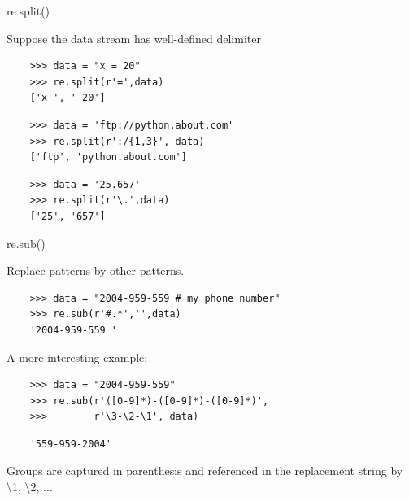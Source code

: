 \documentclass[xcolor=table,10pt,handout]{beamer}
\begin{document}
\begin{frame}[fragile]{re.split()}

  Suppose the data stream has well-defined delimiter

  \vspace{0.4cm}
  \begin{verbatim}
    >>> data = "x = 20"
    >>> re.split(r'=',data)
    ['x ', ' 20']
  \end{verbatim}
  \vspace{0.2cm}
  \pause
  \begin{verbatim} 
    >>> data = 'ftp://python.about.com'
    >>> re.split(r':/{1,3}', data)
    ['ftp', 'python.about.com']
  \end{verbatim}
  \vspace{0.2cm}
  \pause
  \begin{verbatim}
    >>> data = '25.657'
    >>> re.split(r'\.',data)
    ['25', '657']
  \end{verbatim}


\end{frame}



\begin{frame}[fragile]{re.sub()}

  Replace patterns by other patterns.

  \medskip

  \begin{verbatim}
    >>> data = "2004-959-559 # my phone number"
    >>> re.sub(r'#.*','',data)
    '2004-959-559 '
  \end{verbatim}
  \vspace{0.3cm}

  \pause
  A more interesting example:
  
  \medskip

  \begin{verbatim}
    >>> data = "2004-959-559"
    >>> re.sub(r'([0-9]*)-([0-9]*)-([0-9]*)',
    >>>        r'\3-\2-\1', data)
  \end{verbatim}
  \pause
  \vspace{-10pt}
  \begin{verbatim}             
    '559-959-2004'
  \end{verbatim}
  
  \vspace{0.3cm}
  \pause
  \begin{arrowlist}
    \item Groups are captured in parenthesis and referenced in the
      replacement string by \textbackslash1, \textbackslash2, ...
  \end{arrowlist}
\end{frame}
\end{document}
